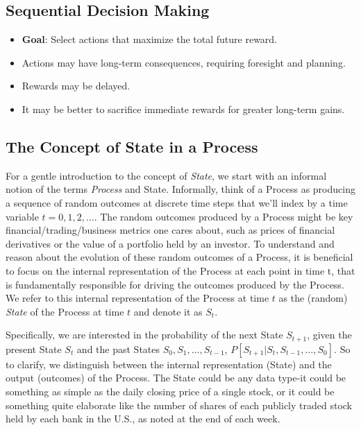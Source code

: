 \subsection{Sequential Decision Making}
\begin{itemize}
    \item \textbf{Goal}: Select actions that maximize the total future reward.
    \item Actions may have long-term consequences, requiring foresight and planning.
    \item Rewards may be delayed.
    \item It may be better to sacrifice immediate rewards for greater long-term gains.
\end{itemize}


\subsection{The Concept of State in a Process}
For a gentle introduction to the concept of \textit{State}, we start with an informal notion of the terms \textit{Process} and State. Informally, think of a Process as producing a sequence of random outcomes at discrete time steps that we’ll index by a time variable $t = 0, 1, 2, \dots$. The random outcomes produced by a Process might be key financial/trading/business metrics one cares about, such as prices of financial derivatives or the value of a portfolio held by an investor. To understand and reason about the evolution of these random outcomes of a Process, it is beneficial to focus on the internal representation of the Process at each point in time t, that is fundamentally responsible for driving the outcomes produced by the Process. We refer to this internal representation of the Process at time $t$ as the (random) \textit{State} of the Process at time $t$ and denote it as $S_t$.

Specifically, we are interested in the probability of the next State $S_{t+1}$, given the present State $S_t$ and the past States $S_0, S_1, \dots, S_{t−1}$, \ie $P[S_{t+1}|S_t, S_{t−1},\dots, S_0]$. So to clarify, we distinguish between the internal representation (State) and the output (outcomes) of the Process. The State could be any data type-it could be something as simple as the daily closing price of a single stock, or it could be something quite elaborate like the number of shares of each publicly traded stock held by each bank in the U.S., as noted at the end of each week.

